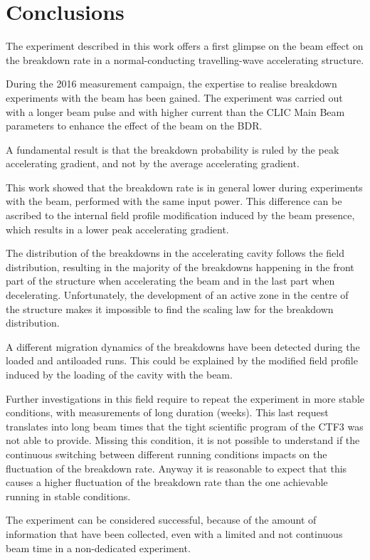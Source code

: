 \newpage
\section{Conclusions}

The experiment described in this work offers a first glimpse on the beam effect on the breakdown rate in a normal-conducting travelling-wave accelerating structure.

During the 2016 measurement campaign, the expertise to realise breakdown experiments with the beam has been gained. The experiment was carried out with a longer beam pulse and with higher current than the CLIC Main Beam parameters to enhance the effect of the beam on the BDR.

A fundamental result is that the breakdown probability is ruled by the peak accelerating gradient, and not by the average accelerating gradient.

This work showed that the breakdown rate is in general lower during experiments with the beam, performed with the same input power. This difference can be ascribed to the internal field profile modification induced by the beam presence, which results in a lower peak accelerating gradient.

The distribution of the breakdowns in the accelerating cavity follows the field distribution, resulting in the majority of the breakdowns happening in the front part of the structure when accelerating the beam and in the last part when decelerating. Unfortunately, the development of an active zone in the centre of the structure makes it impossible to find the scaling law for the breakdown distribution. 

A different migration dynamics of the breakdowns have been detected during the loaded and antiloaded runs. This could be explained by the modified field profile induced by the loading of the cavity with the beam.

Further investigations in this field require to repeat the experiment in more stable conditions, with measurements of long duration (weeks). This last request translates into long beam times that the tight scientific program of the CTF3 was not able to provide. Missing this condition, it is not possible to understand if the continuous switching between different running conditions impacts on the fluctuation of the breakdown rate. Anyway it is reasonable to expect that this causes a higher fluctuation of the breakdown rate than the one achievable running in stable conditions. 

The experiment can be considered successful, because of the amount of information that have been collected, even with a limited and not continuous beam time in a non-dedicated experiment.



